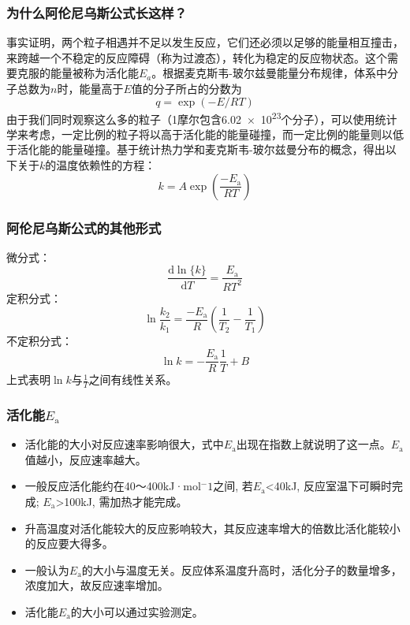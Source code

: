 \documentclass[dvipsnames, svgnames, x11names]{beamer}
\begin{document}
\begin{frame}
    \frametitle{为什么阿伦尼乌斯公式长这样？}
    事实证明，两个粒子相遇并不足以发生反应，它们还必须以足够的能量相互撞击，来跨越一个不稳定的反应障碍（称为过渡态），转化为稳定的反应物状态。这个需要克服的能量被称为活化能$E_a$。根据麦克斯韦-玻尔兹曼能量分布规律，体系中分子总数为$n$时，能量高于$E$值的分子所占的分数为
    \[
        q = \exp (-E/RT)
    \]
    由于我们同时观察这么多的粒子（1摩尔包含\num{6.02e23}个分子），可以使用统计学来考虑，一定比例的粒子将以高于活化能的能量碰撞，而一定比例的能量则以低于活化能的能量碰撞。基于统计热力学和麦克斯韦-玻尔兹曼分布的概念，得出以下关于$k$的温度依赖性的方程：
    \[
        k=A \exp \left(\frac{-E_{\mathrm{a}}}{R T} \right)
    \]
\end{frame}


\begin{frame}
    \frametitle{阿伦尼乌斯公式的其他形式}

    \large 微分式：
    \[
        \frac{\mathrm{d} \ln \{k\}}{\mathrm{d} T}=\frac{E_{\mathrm{a}}}{R T^{2}}
    \]
    定积分式：
    \[
        \ln \frac{k_{2}}{k_{1}}=\frac{-E_{\mathrm{a}}}{R}(\frac{1}{T_{2}}-\frac{1}{T_{1}})
    \]
    不定积分式：
    \[
        \ln {k}=-\frac{E_{\mathrm{a}}}{R} \frac{1}{T}+B
    \]
    上式表明$\ln {k}$与$\frac{1}{T}$之间有线性关系。

\end{frame}


\begin{frame}
    \frametitle{活化能$E_{\mathrm{a}}$}
    \begin{itemize}
        \item 活化能的大小对反应速率影响很大，式中$E_{\mathrm{a}}$出现在指数上就说明了这一点。$E_{\mathrm{a}}$值越小，反应速率越大。
        \item 一般反应活化能约在40～400kJ·mol$^-1$之间, 若$E_{\mathrm{a}}$<40kJ, 反应室温下可瞬时完成; $E_{\mathrm{a}}$>100kJ, 需加热才能完成。
        \item 升高温度对活化能较大的反应影响较大，其反应速率增大的倍数比活化能较小的反应要大得多。
        \item 一般认为$E_{\mathrm{a}}$的大小与温度无关。反应体系温度升高时，活化分子的数量增多，浓度加大，故反应速率增加。
        \item 活化能$E_{\mathrm{a}}$的大小可以通过实验测定。
    \end{itemize}    

\end{frame}


\end{document}
